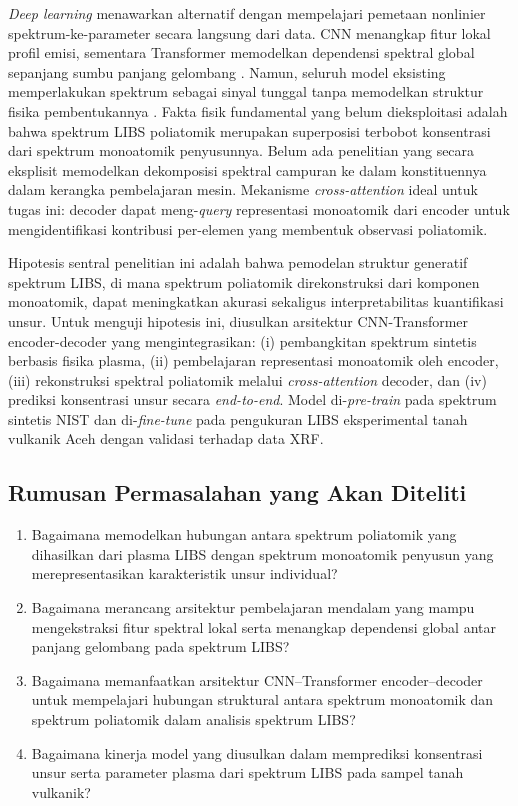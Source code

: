 \documentclass[12pt, a4paper]{article}
\begin{document}
\textit{Deep learning} menawarkan alternatif dengan mempelajari pemetaan nonlinier spektrum-ke-parameter secara langsung dari data. CNN menangkap fitur lokal profil emisi, sementara Transformer memodelkan dependensi spektral global sepanjang sumbu panjang gelombang \citep{liu2026}. Namun, seluruh model eksisting memperlakukan spektrum sebagai sinyal tunggal tanpa memodelkan struktur fisika pembentukannya \citep{hao2024}. Fakta fisik fundamental yang belum dieksploitasi adalah bahwa spektrum LIBS poliatomik merupakan superposisi terbobot konsentrasi dari spektrum monoatomik penyusunnya. Belum ada penelitian yang secara eksplisit memodelkan dekomposisi spektral campuran ke dalam konstituennya dalam kerangka pembelajaran mesin. Mekanisme \textit{cross-attention} \citep{vaswani2017} ideal untuk tugas ini: decoder dapat meng-\textit{query} representasi monoatomik dari encoder untuk mengidentifikasi kontribusi per-elemen yang membentuk observasi poliatomik.

Hipotesis sentral penelitian ini adalah bahwa pemodelan struktur generatif spektrum LIBS, di mana spektrum poliatomik direkonstruksi dari komponen monoatomik, dapat meningkatkan akurasi sekaligus interpretabilitas kuantifikasi unsur. Untuk menguji hipotesis ini, diusulkan arsitektur CNN-Transformer encoder-decoder yang mengintegrasikan: (i) pembangkitan spektrum sintetis berbasis fisika plasma, (ii) pembelajaran representasi monoatomik oleh encoder, (iii) rekonstruksi spektral poliatomik melalui \textit{cross-attention} decoder, dan (iv) prediksi konsentrasi unsur secara \textit{end-to-end}. Model di-\textit{pre-train} pada spektrum sintetis NIST dan di-\textit{fine-tune} pada pengukuran LIBS eksperimental tanah vulkanik Aceh dengan validasi terhadap data XRF.

\subsection{Rumusan Permasalahan yang Akan Diteliti}
\begin{enumerate}[label=\arabic*.]
    \item Bagaimana memodelkan hubungan antara spektrum poliatomik yang dihasilkan dari plasma LIBS dengan spektrum monoatomik penyusun yang merepresentasikan karakteristik unsur individual?
    \item Bagaimana merancang arsitektur pembelajaran mendalam yang mampu mengekstraksi fitur spektral lokal serta menangkap dependensi global antar panjang gelombang pada spektrum LIBS?
    \item Bagaimana memanfaatkan arsitektur CNN–Transformer encoder–decoder untuk mempelajari hubungan struktural antara spektrum monoatomik dan spektrum poliatomik dalam analisis spektrum LIBS?
    \item Bagaimana kinerja model yang diusulkan dalam memprediksi konsentrasi unsur serta parameter plasma dari spektrum LIBS pada sampel tanah vulkanik?
\end{enumerate}
\end{document}
